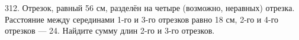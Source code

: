 312. Отрезок, равный 56 см, разделён на четыре (возможно, неравных) отрезка. Расстояние между серединами 1-го и 3-го отрезков равно 18 см, 2-го и 4-го отрезков --- 24. Найдите сумму длин 2-го и 3-го отрезков.\\
